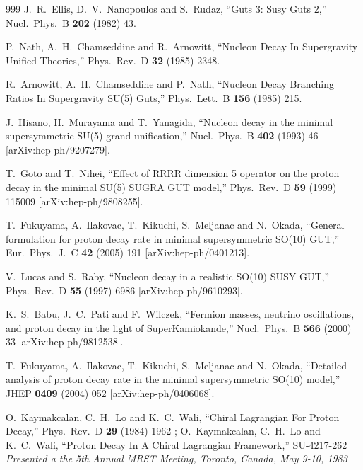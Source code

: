 \begin{thebibliography}{999}
  J.~R.~Ellis, D.~V.~Nanopoulos and S.~Rudaz,
  ``Guts 3: Susy Guts 2,''
  Nucl.\ Phys.\ B {\bf 202} (1982) 43.

  P.~Nath, A.~H.~Chamseddine and R.~Arnowitt,
  ``Nucleon Decay In Supergravity Unified Theories,''
  Phys.\ Rev.\ D {\bf 32} (1985) 2348.

  R.~Arnowitt, A.~H.~Chamseddine and P.~Nath,
  ``Nucleon Decay Branching Ratios In Supergravity SU(5) Guts,''
  Phys.\ Lett.\ B {\bf 156} (1985) 215.

  J.~Hisano, H.~Murayama and T.~Yanagida,
  ``Nucleon decay in the minimal supersymmetric SU(5) grand unification,''
  Nucl.\ Phys.\ B {\bf 402} (1993) 46
  [arXiv:hep-ph/9207279].

  T.~Goto and T.~Nihei,
  ``Effect of RRRR dimension 5 operator on the proton decay in the minimal
  SU(5) SUGRA GUT model,''
  Phys.\ Rev.\ D {\bf 59} (1999) 115009
  [arXiv:hep-ph/9808255].

  T.~Fukuyama, A.~Ilakovac, T.~Kikuchi, S.~Meljanac and N.~Okada,
  ``General formulation for proton decay rate in minimal supersymmetric  SO(10)
  GUT,''
  Eur.\ Phys.\ J.\ C {\bf 42} (2005) 191
  [arXiv:hep-ph/0401213].

  V.~Lucas and S.~Raby,
  ``Nucleon decay in a realistic SO(10) SUSY GUT,''
  Phys.\ Rev.\ D {\bf 55} (1997) 6986
  [arXiv:hep-ph/9610293].

  K.~S.~Babu, J.~C.~Pati and F.~Wilczek,
  ``Fermion masses, neutrino oscillations, and proton decay in the light of
  SuperKamiokande,''
  Nucl.\ Phys.\ B {\bf 566} (2000) 33
  [arXiv:hep-ph/9812538].

  T.~Fukuyama, A.~Ilakovac, T.~Kikuchi, S.~Meljanac and N.~Okada,
  ``Detailed analysis of proton decay rate in the minimal supersymmetric
  SO(10) model,''
  JHEP {\bf 0409} (2004) 052
  [arXiv:hep-ph/0406068].

  O.~Kaymakcalan, C.~H.~Lo and K.~C.~Wali,
  ``Chiral Lagrangian For Proton Decay,''
  Phys.\ Rev.\ D {\bf 29} (1984) 1962
;
 O.~Kaymakcalan, C.~H.~Lo and K.~C.~Wali,
  ``Proton Decay In A Chiral Lagrangian Framework,''
SU-4217-262
{\it Presented a the 5th Annual MRST Meeting, Toronto, Canada, May 9-10, 1983}


\end{thebibliography}
